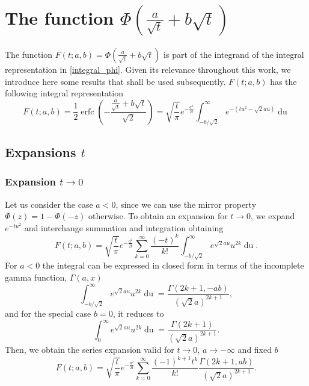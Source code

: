 \documentclass[10pt,a4paper,oneside]{article}
\DeclareMathOperator{\erfc}{erfc}
\numberwithin{equation}{section}
\begin{document}
\section{The function $\Phi\left(\frac{a}{\sqrt{t}} + b\sqrt{t}\right)$}

The function $F(t; a, b) = \Phi\left(\frac{a}{\sqrt{t}} + b\sqrt{t}\right)$ is part of the integrand of the integral representation in \eqref{integral_phi}. Given its relevance throughout this work, we introduce here some results that shall be used subsequently. $F(t; a, b)$ has the following integral representation \cite[\S 7.7.6]{NIST:DLMF}
\begin{equation}\label{integral_erfc_ab}
F(t; a, b) = \frac{1}{2}\erfc\left(-\frac{\frac{a}{\sqrt{t}} + b\sqrt{t}}{\sqrt{2}}\right)  = \sqrt{\frac{t}{\pi}} e^{-\frac{a^2}{2t}} \int_{-b/\sqrt{2}}^{\infty} e^{-(tu^2 - \sqrt{2}au)} \mathop{du}
\end{equation}

\subsection{Expansions $t$}

\subsubsection{Expansion $t \to 0$}

Let us consider the case $a < 0$, since we can use the mirror property $\Phi(z) = 1 - \Phi(-z)$ otherwise. To obtain an expansion for $t \to 0$, we expand $e^{-tu^2}$ and interchange summation and integration obtaining
\begin{equation*}
F(t; a, b) = \sqrt{\frac{t}{\pi}} e^{-\frac{a^2}{2t}} \sum_{k=0}^{\infty} \frac{(-t)^k}{k!}\int_{-b/\sqrt{2}}^{\infty} e^{\sqrt{2}a u} u^{2k}\mathop{du}.
\end{equation*}
For $a < 0$ the integral can be expressed in closed form in terms of the incomplete gamma function, $\Gamma(a, x)$
\begin{equation*}
\int_{-b/\sqrt{2}}^{\infty} e^{\sqrt{2}a u} u^{2k}\mathop{du} = \frac{\Gamma(2k+1, -ab)}{(\sqrt{2}a)^{2k+1}},
\end{equation*}
and for the special case $b=0$, it reduces to
\begin{equation*}
\int_{0}^{\infty} e^{\sqrt{2}a u} u^{2k}\mathop{du} = \frac{\Gamma(2k+1)}{(\sqrt{2}a)^{2k+1}}.
\end{equation*}
Then, we obtain the series expansion valid for $t \to 0$, $a \to -\infty$ and fixed $b$
\begin{equation}\label{phi_expansion_incgamma_t_small}
F(t; a, b) = \sqrt{\frac{t}{\pi}} e^{-\frac{a^2}{2t}} \sum_{k=0}^{\infty} \frac{(-1)^{k+1} t^k}{k!}\frac{\Gamma(2k + 1, ab)}{(\sqrt{2}a)^{2k+1}}.
\end{equation}
\end{document}
